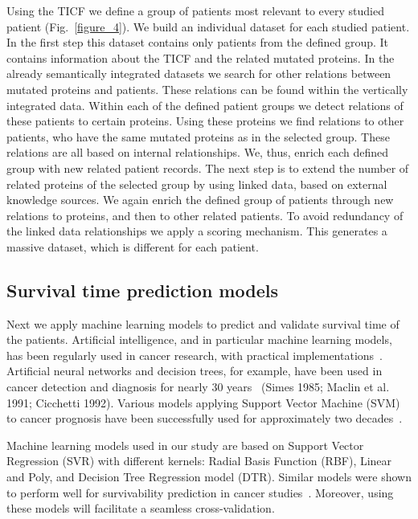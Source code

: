 \documentclass{bmcart}
\begin{document}
Using the TICF we define a group of patients most relevant to every
studied patient (Fig.~\ref{figure_4}). We build an individual dataset for each
studied patient. In the first step this dataset contains only patients
from the defined group. It contains information about the TICF and the
related mutated proteins. In the already semantically integrated
datasets we search for other relations between mutated proteins and
patients. These relations can be found within the vertically integrated
data. Within each of the defined patient groups we detect relations of
these patients to certain proteins. Using these proteins we find
relations to other patients, who have the same mutated proteins as in
the selected group. These relations are all based on internal
relationships. We, thus, enrich each defined group with new related
patient records. The next step is to extend the number of related
proteins of the selected group by using linked data, based on external
knowledge sources. We again enrich the defined group of patients
through new relations to proteins, and then to other related patients.
To avoid redundancy of the linked data relationships we apply a scoring
mechanism. This generates a massive dataset, which is different for
each patient.  

\subsection{Survival time prediction models}

Next we apply machine learning models to predict and validate survival
time of the patients. Artificial intelligence, and in particular
machine learning models, has been regularly used in cancer research,
with practical implementations~\cite{18}. Artificial neural networks and
decision trees, for example, have been used in cancer detection and
diagnosis for nearly 30 years~\cite{34} (Simes 1985; Maclin et al. 1991;
Cicchetti 1992). Various models applying Support Vector Machine (SVM)
to cancer prognosis have been successfully used for approximately two
decades~\cite{17}.

Machine learning models used in our study are based on Support Vector
Regression (SVR) with different kernels: Radial Basis Function (RBF),
Linear and Poly, and Decision Tree Regression model (DTR). Similar
models were shown to perform well for survivability prediction in
cancer studies~\cite{19,20}. Moreover, using these models will facilitate a
seamless cross-validation.
\end{document}
